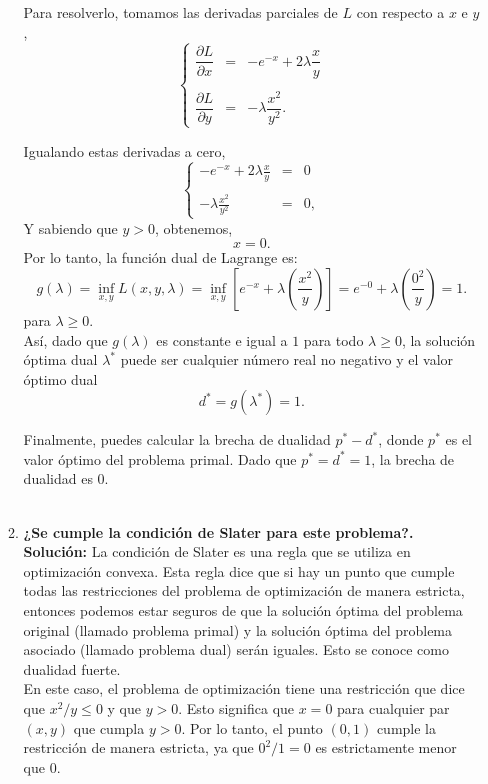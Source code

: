 \begin{enumerate}
\begin{enumerate}[\bfseries (a)]
	    Para resolverlo, tomamos las derivadas parciales de $L$ con respecto a $x$ e $y$, 
	    $$
	    \left\{
		\begin{array}{rcl}
		    \dfrac{\partial L}{\partial x} &=& -e^{-x} + 2\lambda \dfrac{x}{y}\\\\
		    \dfrac{\partial L}{\partial y} &=& -\lambda \dfrac{x^2}{y^2}.
		\end{array}
	    \right.
	    $$

	    Igualando estas derivadas a cero,
	    $$
	    \left\{
		\begin{array}{rcl}
		    -e^{-x} + 2\lambda \frac{x}{y} &=& 0\\\\
		    -\lambda \frac{x^2}{y^2} &=& 0,
		\end{array}
	    \right.
	    $$
	    Y sabiendo que $y > 0$, obtenemos, 
	    $$x = 0.$$
	    Por lo tanto, la función dual de Lagrange es:
	    $$
	    g(\lambda) = \inf_{x,y} L(x,y,\lambda) = \inf_{x,y} \left[e^{-x} + \lambda \left(\frac{x^2}{y}\right)\right] = e^{-0} + \lambda \left(\frac{0^2}{y}\right) = 1.
	    $$
	    para $\lambda \geq 0$.\\

	    Así, dado que $g(\lambda)$ es constante e igual a $1$ para todo $\lambda \geq 0$, la solución óptima dual $\lambda^*$ puede ser cualquier número real no negativo y el valor óptimo dual 
	    $$d^* = g(\lambda^*) = 1.$$

	    Finalmente, puedes calcular la brecha de dualidad $p^*-d^*$, donde $p^*$ es el valor óptimo del problema primal. Dado que $p^* = d^* = 1$, la brecha de dualidad es $0$.\\\\

	\item \textbf{\boldmath ¿Se cumple la condición de Slater para este problema?.}\\

	    \textbf{Solución:} La condición de Slater es una regla que se utiliza en optimización convexa. Esta regla dice que si hay un punto que cumple todas las restricciones del problema de optimización de manera estricta, entonces podemos estar seguros de que la solución óptima del problema original (llamado problema primal) y la solución óptima del problema asociado (llamado problema dual) serán iguales. Esto se conoce como dualidad fuerte.\\

	    En este caso, el problema de optimización tiene una restricción que dice que $x^2/y\leq 0$ y que $y>0$. Esto significa que $x=0$ para cualquier par $(x,y)$ que cumpla $y>0$. Por lo tanto, el punto $(0,1)$ cumple la restricción de manera estricta, ya que $0^2/1=0$ es estrictamente menor que 0.\\


\end{enumerate}
\end{enumerate}
